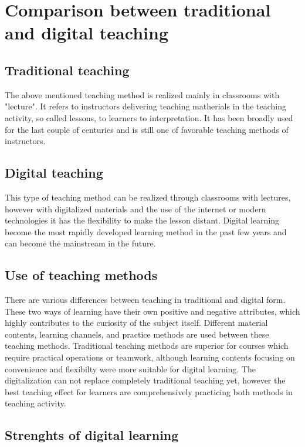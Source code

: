\documentclass[10pt,twoside,english,a4paper]{article}
\begin{document}
\section{Comparison between traditional and digital teaching}

\subsection{Traditional teaching}

	The above mentioned teaching method is realized mainly in classrooms with "lecture". It refers to instructors delivering teaching matherials in the teaching activity, so called lessons, to learners to interpretation. It has been broadly used for the last couple of centuries and is still one of favorable teaching methods of instructors.\cite{Lin2017}

\subsection{Digital teaching}

	This type of teaching method can be realized through classrooms with lectures, however with digitalized materials and the use of the internet or modern technologies it has the flexibility to make the lesson distant. Digital learning become the most rapidly developed learning method in the past few years and can become the mainstream in the future.\cite{Lin2017}

\subsection{Use of teaching methods}

	There are various differences between teaching in traditional and digital form. These two ways of learning have their own positive and negative attributes, which highly contributes to the curiosity of the subject itself. Different material contents, learning channels, and practice methods are used between these teaching methods. Traditional teaching methods are superior for courses which require practical operations or teamwork, although learning contents focusing on convenience and flexibilty were more suitable for digital  learning. The digitalization can not replace completely traditional teaching yet, however the best teaching effect for learners are comprehensively practicing both methods in teaching activity.\cite{Lin2017}

\subsection{Strenghts of digital learning}
\end{document}
